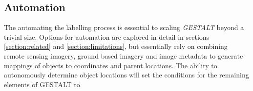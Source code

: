 \subsection{Automation}
The automating the labelling process is essential to scaling \textit{GESTALT} beyond a trivial size. 
Options for automation are explored in detail in sections \ref{section:related} and \ref{section:limitations}, but essentially rely on combining remote sensing imagery, ground based imagery and image metadata to generate mappings of objects to coordinates and parent locations.
The ability to autonomously determine object locations will set the conditions for the remaining elements of GESTALT to  



